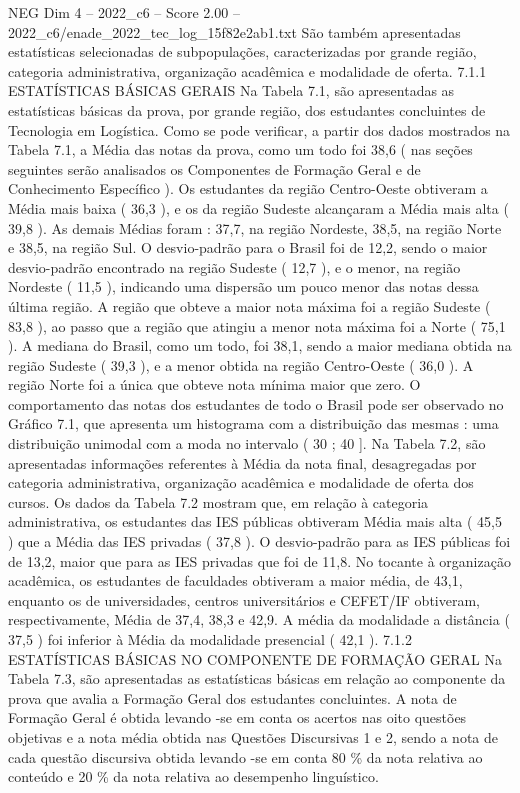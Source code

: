 \begin{textsample}{NEG Dim 4 – 2022\_c6 – Score 2.00 – 2022\_c6/enade\_2022\_tec\_log\_15f82e2ab1.txt}
São também apresentadas estatísticas selecionadas de subpopulações, caracterizadas por grande região, categoria administrativa, organização acadêmica e modalidade de oferta. 7.1.1 ESTATÍSTICAS BÁSICAS GERAIS Na Tabela 7.1, são apresentadas as estatísticas básicas da prova, por grande região, dos estudantes concluintes de Tecnologia em Logística.
Como se pode verificar, a partir dos dados mostrados na Tabela 7.1, a Média das notas da prova, como um todo foi 38,6 ( nas seções seguintes serão analisados os Componentes de Formação Geral e de Conhecimento Específico ).
Os estudantes da região Centro-Oeste obtiveram a Média mais baixa ( 36,3 ), e os da região Sudeste alcançaram a Média mais alta ( 39,8 ).
As demais Médias foram : 37,7, na região Nordeste, 38,5, na região Norte e 38,5, na região Sul.
O desvio-padrão para o Brasil foi de 12,2, sendo o maior desvio-padrão encontrado na região Sudeste ( 12,7 ), e o menor, na região Nordeste ( 11,5 ), indicando uma dispersão um pouco menor das notas dessa última região.
A região que obteve a maior nota máxima foi a região Sudeste ( 83,8 ), ao passo que a região que atingiu a menor nota máxima foi a Norte ( 75,1 ).
A mediana do Brasil, como um todo, foi 38,1, sendo a maior mediana obtida na região Sudeste ( 39,3 ), e a menor obtida na região Centro-Oeste ( 36,0 ).
A região Norte foi a única que obteve nota mínima maior que zero.
O comportamento das notas dos estudantes de todo o Brasil pode ser observado no Gráfico 7.1, que apresenta um histograma com a distribuição das mesmas : uma distribuição unimodal com a moda no intervalo ( 30 ; 40 ].
Na Tabela 7.2, são apresentadas informações referentes à Média da nota final, desagregadas por categoria administrativa, organização acadêmica e modalidade de oferta dos cursos.
Os dados da Tabela 7.2 mostram que, em relação à categoria administrativa, os estudantes das IES públicas obtiveram Média mais alta ( 45,5 ) que a Média das IES privadas ( 37,8 ).
O desvio-padrão para as IES públicas foi de 13,2, maior que para as IES privadas que foi de 11,8.
No tocante à organização acadêmica, os estudantes de faculdades obtiveram a maior média, de 43,1, enquanto os de universidades, centros universitários e CEFET/IF obtiveram, respectivamente, Média de 37,4, 38,3 e 42,9.
A média da modalidade a distância ( 37,5 ) foi inferior à Média da modalidade presencial ( 42,1 ). 7.1.2 ESTATÍSTICAS BÁSICAS NO COMPONENTE DE FORMAÇÃO GERAL Na Tabela 7.3, são apresentadas as estatísticas básicas em relação ao componente da prova que avalia a Formação Geral dos estudantes concluintes.
A nota de Formação Geral é obtida levando -se em conta os acertos nas oito questões objetivas e a nota média obtida nas Questões Discursivas 1 e 2, sendo a nota de cada questão discursiva obtida levando -se em conta 80 \% da nota relativa ao conteúdo e 20 \% da nota relativa ao desempenho linguístico.

\end{textsample}
